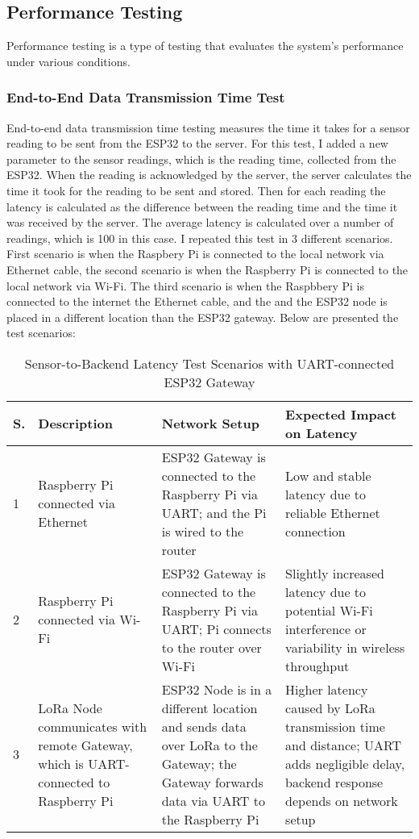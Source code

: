 \subsection{Performance Testing}
Performance testing is a type of testing that evaluates the system's performance under various conditions.
\subsubsection{End-to-End Data Transmission Time Test}
End-to-end data transmission time testing measures the time it takes for a sensor reading to be sent from the ESP32 to the server.
For this test, I added a new parameter to the sensor readings, which is the reading time, collected from the ESP32. When the reading is acknowledged
by the server, the server calculates the time it took for the reading to be sent and stored. Then for each reading the latency is calculated as
the difference between the reading time and the time it was received by the server.
The average latency is calculated over a number of readings, which is 100 in this case. 
I repeated this test in 3 different scenarios. First scenario is when the Raspbery Pi is connected to the local network via Ethernet cable,
the second scenario is when the Raspberry Pi is connected to the local network via Wi-Fi. The third scenario is when the Raspbbery Pi is connected to the internet
the Ethernet cable, and the and the ESP32 node is placed in a different location than the ESP32 gateway. 
Below are presented the test scenarios:
\begin{table}[H]
\centering
\begin{tabular}{|p{1.2cm}|p{5cm}|p{5cm}|p{5cm}|}
\hline
\textbf{S.} & \textbf{Description} & \textbf{Network Setup} & \textbf{Expected Impact on Latency} \\
\hline
1 & Raspberry Pi connected via Ethernet & ESP32 Gateway is connected to the Raspberry Pi via UART; and the Pi is wired to the router & Low and stable latency due to reliable Ethernet connection \\
\hline
2 & Raspberry Pi connected via Wi-Fi & ESP32 Gateway is connected to the Raspberry Pi via UART; Pi connects to the router over Wi-Fi & Slightly increased latency due to potential Wi-Fi interference or variability in wireless throughput \\
\hline
3 & LoRa Node communicates with remote Gateway, which is UART-connected to Raspberry Pi & ESP32 Node is in a different location and sends data over LoRa to the Gateway; the Gateway forwards data via UART to the Raspberry Pi & Higher latency caused by LoRa transmission time and distance; UART adds negligible delay, backend response depends on network setup \\
\hline
\end{tabular}
\caption{Sensor-to-Backend Latency Test Scenarios with UART-connected ESP32 Gateway}
\label{tab:latency_scenarios_uart}
\end{table}

